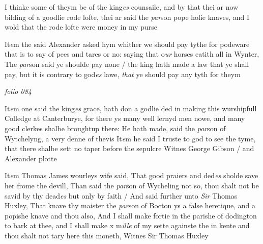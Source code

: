\documentclass[12pt, a4paper]{book}
\begin{document}
				\marginpar[\vspace{0.5cm}{\textcolor{Gray}{n}}]{}
			
	
		\ifthenelse{\isodd{\thepage}}
		{\reversemarginpar}
		{\normalmarginpar}
		I thinke some of theym be of the king\textit{es} counsaile, and by that
 thei ar now bilding of a goodlie rode lofte, thei ar said the \textit{par}son
 pope holie knaves, and I wold that the rode lofte were money
 in my purse
	
		
				\marginpar[\vspace{0.5cm}{\textcolor{Gray}{n}}]{}
			
		
			
		
		\ifthenelse{\isodd{\thepage}}
		{\reversemarginpar}
		{\normalmarginpar}
		It\textit{e}m the said Alexander asked hym whither we should pay tythe
 for podeware that is to say of pees and tares or no: saying
 that o\textit{ur} horses eatith all in Wynter, The \textit{par}son said ye shoulde
 pay none / the king hath made a law that ye shall pay, but it is
 contrary to god\textit{es} lawe, \textit{that} ye should pay any tyth for theym


\dotfill
					

\textit{folio 084}



	
				\marginpar[\vspace{0.5cm}{\textcolor{Gray}{seditious}}]{}
			
	
		\ifthenelse{\isodd{\thepage}}
		{\reversemarginpar}
		{\normalmarginpar}
		It\textit{e}m one said the king\textit{es} grace, hath don a godlie ded in making this
		wurshipfull Colledge at Canterburye, for there ys many well
 lernyd men nowe, and many good clerkes shalbe broughtup there:
 He hath made, said the \textit{par}son of Wytchelyng, a very denne of thevis
 It\textit{e}m he said I truste to god to see the tyme, that there shalbe sett no taper
 before the sepulcre Witnes George Gibson / and Alexander plotte

	
	
				\marginpar[\vspace{0.5cm}{\textcolor{Gray}{xxix daye of Maye}}]{}
			
	
				\marginpar[\vspace{0.5cm}{\textcolor{Gray}{seditious}}]{}
			
	
		\ifthenelse{\isodd{\thepage}}
		{\reversemarginpar}
		{\normalmarginpar}
		It\textit{e}m Thomas James wourleys wife said, That good praiers and ded\textit{es}
		sholde save her frome the devill, Than said the \textit{par}son of Wycheling
  not so, thou shalt not be savid by thy dead\textit{es} but only by faith /
		And said further unto \textit{Sir} Thomas Huxley, That knave thy maister
 the \textit{par}son of Bocton ys a false heretique, and a popishe knave and
 thou also, And I shall make fortie in the parishe of dodington to bark
 at thee, and I shall make x m\textit{ille} of my sette againste the in kente
 and thou shalt not tary here this moneth, Witnes Sir Thomas
 Huxley
\end{document}
